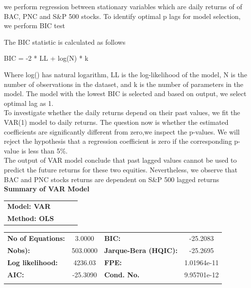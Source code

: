 \documentclass[a4paper, 11pt]{article}
\begin{document}
we perform regression between stationary variables which are daily returns of of BAC, PNC and S\&P 500 stocks. To identify optimal p lags for model selection, we perform BIC test 




The BIC statistic is calculated as follows 

BIC = -2 * LL + log(N) * k

Where log() has natural logarithm, LL is the log-likelihood of the model, N is the number of observations in the dataset, and k is the number of parameters in the model. The model with the lowest BIC is selected and based on output, we select optimal lag as 1.\\

To investigate whether the daily returns depend on their past values, we fit the VAR(1) model to daily returns.
The question now is whether the estimated coefficients are significantly different from zero,we inspect the p-values. We will reject the hypothesis that a regression coefficient is zero if the corresponding p-value is less than 5\%.\\

The output of VAR model conclude that past lagged values cannot be used to predict the future returns for these two equities. Nevertheless, we observe that BAC and PNC stocks returns are dependent on S\&P 500 lagged returns
\\

\textbf{Summary of VAR Model}\\

\begin{tabular}{lclc}
\toprule
\textbf{Model:   VAR}         &              &    & \\
\textbf{Method:  OLS}        &              &    & \\
\end{tabular}

\begin{tabular}{lclc}
\toprule
\textbf{No of Equations:}       &  3.0000 & \textbf{  BIC:     } &    -25.2083  \\
\textbf{Nobs):} &  503.0000 & \textbf{  Jarque-Bera (HQIC):  } &    -25.2695  \\
\textbf{Log likelihood:}          & 4236.03 & \textbf{  FPE:          } &   1.01964e-11  \\
\textbf{AIC:}      &  -25.3090 & \textbf{  Cond. No.          } &     9.95701e-12  \\
\bottomrule
\\
\end{tabular}
\end{document}
